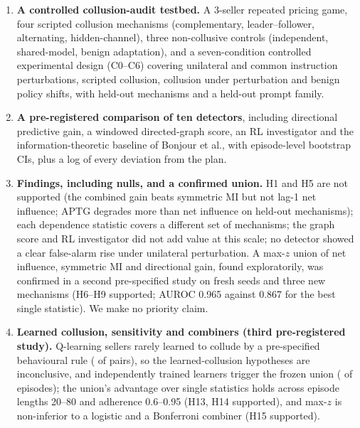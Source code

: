 \documentclass[11pt]{article}
\begin{document}
\begin{enumerate}
\item \textbf{A controlled collusion-audit testbed.} A 3-seller repeated pricing game, four scripted collusion mechanisms (complementary, leader--follower, alternating, hidden-channel), three non-collusive controls (independent, shared-model, benign adaptation), and a seven-condition controlled experimental design (C0--C6) covering unilateral and common instruction perturbations, scripted collusion, collusion under perturbation and benign policy shifts, with held-out mechanisms and a held-out prompt family.
\item \textbf{A pre-registered comparison of ten detectors}, including directional predictive gain, a windowed directed-graph score, an RL investigator and the information-theoretic baseline of Bonjour et al., with episode-level bootstrap CIs, plus a log of every deviation from the plan.
\item \textbf{Findings, including nulls, and a confirmed union.} H1 and H5 are not supported (the combined gain beats symmetric MI but not lag-1 net influence; APTG degrades more than net influence on held-out mechanisms); each dependence statistic covers a different set of mechanisms; the graph score and RL investigator did not add value at this scale; no detector showed a clear false-alarm rise under unilateral perturbation. A max-$z$ union of net influence, symmetric MI and directional gain, found exploratorily, was confirmed in a second pre-specified study on fresh seeds and three new mechanisms (H6--H9 supported; AUROC 0.965 against 0.867 for the best single statistic). We make no priority claim.
\item \textbf{Learned collusion, sensitivity and combiners (third pre-registered study).} Q-learning sellers rarely learned to collude by a pre-specified behavioural rule (\fPosPairs{} of \fJointPairs{} pairs), so the learned-collusion hypotheses are inconclusive, and independently trained learners trigger the frozen union (\fAlarmIndUthree{} of episodes); the union's advantage over single statistics holds across episode lengths 20--80 and adherence 0.6--0.95 (H13, H14 supported), and max-$z$ is non-inferior to a logistic and a Bonferroni combiner (H15 supported).
\end{enumerate}
\end{document}
